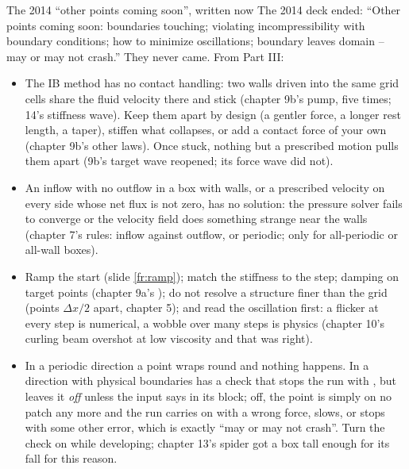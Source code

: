 \documentclass[aspectratio=169,11pt]{beamer}
\begin{document}
\begin{frame}{The 2014 ``other points coming soon'', written now}
\label{fr:soon}
\footnotesize The 2014 deck ended: ``Other points coming soon: boundaries touching; violating incompressibility with boundary conditions; how to minimize oscillations; boundary leaves domain -- may or may not crash.'' They never came. From Part III:
\begin{itemize}\scriptsize
  \item {} The IB method has no contact handling: two walls driven into the same grid cells share the fluid velocity there and stick (chapter 9b's pump, five times; 14's stiffness wave). Keep them apart by design (a gentler force, a longer rest length, a taper), stiffen what collapses, or add a contact force of your own (chapter 9b's other laws). Once stuck, nothing but a prescribed motion pulls them apart (9b's target wave reopened; its force wave did not).
  \item {} An inflow with no outflow in a box with walls, or a prescribed velocity on every side whose net flux is not zero, has no solution: the pressure solver fails to converge or the velocity field does something strange near the walls (chapter 7's rules: inflow against outflow, or periodic;  only for all-periodic or all-wall boxes).
  \item {} Ramp the start (slide \ref{fr:ramp}); match the stiffness to the step; damping on target points (chapter 9a's ); do not resolve a structure finer than the grid (points $\Delta x/2$ apart, chapter 5); and read the oscillation first: a flicker at every step is numerical, a wobble over many steps is physics (chapter 10's curling beam overshot at low viscosity and that was right).
  \item {} In a periodic direction a point wraps round and nothing happens. In a direction with physical boundaries  has a check that stops the run with , but  leaves it \emph{off} unless the input says  in its block; off, the point is simply on no patch any more and the run carries on with a wrong force, slows, or stops with some other error, which is exactly ``may or may not crash''. Turn the check on while developing; chapter 13's spider got a box tall enough for its fall for this reason.
\end{itemize}
\end{frame}
\end{document}
